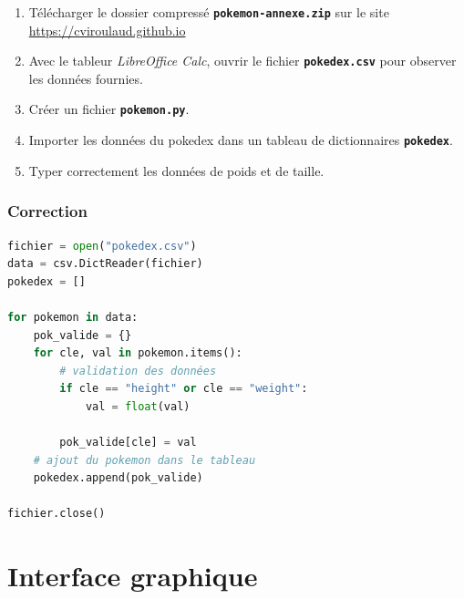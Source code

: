 \documentclass[svgnames,11pt]{beamer}
\begin{document}
\begin{frame}
    \frametitle{}

    \begin{activite}
        \begin{enumerate}
            \item Télécharger le dossier compressé \textbf{\texttt{pokemon-annexe.zip}} sur le site \url{https://cviroulaud.github.io}
            \item Avec le tableur \emph{LibreOffice Calc}, ouvrir le fichier \texttt{\textbf{pokedex.csv}} pour observer les données fournies.
            \item Créer un fichier \texttt{\textbf{pokemon.py}}.
            \item Importer les données du pokedex dans un tableau de dictionnaires \textbf{\texttt{pokedex}}. 
            \item Typer correctement les données de poids et de taille.
        \end{enumerate}
    \end{activite}

\end{frame}
\begin{frame}[fragile]
    \frametitle{Correction}
    \begin{center}
        \begin{lstlisting}[language=Python , basicstyle=\ttfamily\small, xleftmargin=1em, xrightmargin=1em]
fichier = open("pokedex.csv")
data = csv.DictReader(fichier)
pokedex = []

for pokemon in data:
    pok_valide = {}
    for cle, val in pokemon.items():
        # validation des données
        if cle == "height" or cle == "weight":
            val = float(val)

        pok_valide[cle] = val
    # ajout du pokemon dans le tableau
    pokedex.append(pok_valide)

fichier.close()
\end{lstlisting}
        \label{CODE}
    \end{center}

\end{frame}

\section{Interface graphique}
\end{document}

